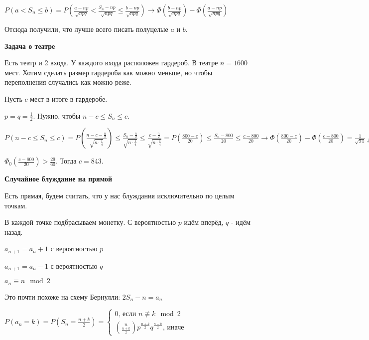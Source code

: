 \begin{remark}
    $P(a < S_n \leqslant b) = P(\frac{a - np}{\sqrt{npq}} < \frac{S_n - np}{\sqrt{npq}} \leqslant \frac{b - np}{\sqrt{npq}}) \to
    \Phi (\frac{b - np}{\sqrt{npq}}) - \Phi (\frac{a - np}{\sqrt{npq}})$

    Отсюда получили, что лучше всего писать полуцелые $a$ и $b$.
\end{remark}

\begin{example}
    \textbf{Задача о театре}

    Есть театр и 2 входа. У каждого входа расположен гардероб. 
    В театре $n = 1600$ мест. Хотим сделать размер гардероба как можно меньше, но чтобы
    переполнения случались как можно реже.

    Пусть $c$ мест в итоге в гардеробе.

    $p = q = \frac{1}{2}$. Нужно, чтобы $n - c \leqslant S_n \leqslant c$. 

    $P(n - c \leqslant S_n \leqslant c) = P(\frac{n - c - \frac{n}{2}}{\sqrt{n \cdot \frac{1}{4}}})
    \leqslant \frac{S_n - \frac{n}{2}}{\sqrt{n \cdot \frac{1}{4}}} \leqslant \frac{c - \frac{n}{2}}{\sqrt{n \cdot \frac{1}{4}}} =
    P(\frac{800 - c}{20}) \leqslant \frac{S_n - 800}{20} \leqslant \frac{c - 800}{20} \to \Phi (\frac{800 - c}{20}) - \Phi (\frac{c - 800}{20}) =
    \frac{1}{\sqrt{2\pi}} \int_{\frac{800 - c}{20}}^{\frac{c - 800}{20}} e^{-\frac{t^2}{2}} \, dt > \frac{29}{30}$

    $\Phi_0 (\frac{c - 800}{20}) > \frac{29}{60}$. Тогда $c = 843$.

\end{example}

\begin{example}
    \textbf{Случайное блуждание на прямой}

    Есть прямая, будем считать, что у нас блуждания исключительно по целым точкам.

    В каждой точке подбрасываем монетку. С вероятностью $p$ идём вперёд, $q$ - идём назад.

    $a_{n + 1} = a_{n} + 1$ с вероятностью $p$

    $a_{n + 1} = a_{n} - 1$ с вероятностью $q$

    $a_n \equiv n \mod 2$

    Это почти похоже на схему Бернулли: $2S_n - n = a_n$

    $P(a_n = k) = P(S_n = \frac{n + k}{2}) = \begin{cases}
        0 \text{, если } n \not \equiv k \mod 2 \\
        \binom{n}{\frac{n + k}{2}} p^{\frac{n + k}{2}} q^{\frac{n - k}{2}} \text{, иначе}
    \end{cases}$
\end{example}

